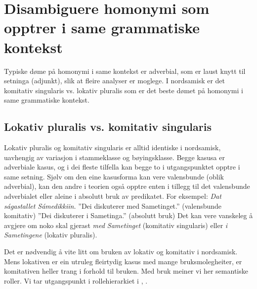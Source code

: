 \documentclass[a4paper,norsk]{article}
\begin{document}
\section{Disambiguere homonymi som opptrer i same grammatiske kontekst}



Typiske døme på homonymi i same kontekst er adverbial, som er laust knytt til setninga (adjunkt), slik at fleire analyser er moglege. I nordsamisk er det komitativ singularis vs. lokativ pluralis som er det beste dømet på homonymi i same grammatiske kontekst. %





\subsection{Lokativ pluralis vs. komitativ singularis}


Lokativ pluralis og komitativ singularis er alltid identiske i nordsamisk, uavhengig av variasjon i stammeklasse og bøyingsklasse. Begge kasusa er adverbiale kasus, og i dei fleste tilfella kan begge to i utgangspunktet opptre i same setning. Sjølv om den eine kasusforma kan vere valensbunde (oblik adverbial), kan den andre i teorien også opptre enten i tillegg til det valensbunde adverbialet eller aleine i absolutt bruk av predikatet.
For eksempel:
\textit {Dat ságastallet Sámedikkiin.}
''Dei diskuterer med Sametinget.'' (valensbunde komitativ)
''Dei diskuterer i Sametinga.'' (absolutt bruk)
Det kan vere vanskeleg å avgjere om noko skal gjerast \textit{med Sametinget} (komitativ singularis) eller \textit{i Sametingene} (lokativ pluralis). %

Det er nødvendig å vite litt om bruken av lokativ og komitativ i nordsamisk. Mens lokativen er ein utruleg fleirtydig kasus med mange bruksmolegheiter, er komitativen heller trang i forhold til bruken. Med bruk meiner vi her semantiske roller. Vi tar utgangspunkt i rollehierarkiet i \citet{Sammallahti02},\citet{Sammallahti05} %
.
\end{document}

